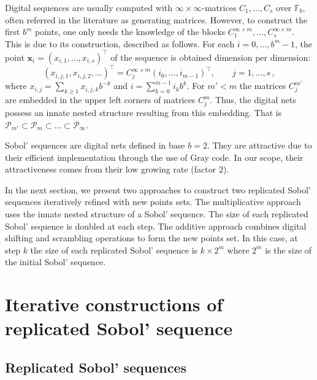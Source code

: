 \documentclass[]{elsarticle}
\theoremstyle{definition}
\newcommand{\bvec}[1]{\boldsymbol{#1}}
\newcommand{\vx}{\bvec{x}}
\begin{document}
Digital sequences are usually computed with $\infty\times\infty$-matrices $C_1,\dots,C_s$ over $\mathbb{F}_b$, often referred in the literature as generating matrices. However, to construct the first $b^m$ points, one only needs the knowledge of the blocks $C_1^{\infty\times m},\dots,C_s^{\infty\times m}$. This is due to its construction, described as follows. For each $i=0,\dots,b^m-1$, the point $\vx_i = (x_{i,1},\dots,x_{i,s})^\intercal$ of the sequence is obtained dimension per dimension:
\begin{equation}
\label{dig.net.eq.}
(x_{i,j,1},x_{i,j,2},\dots)^\intercal = C_j^{\infty\times m} (i_{0},\dots,i_{m-1})^\intercal,\qquad j= 1,\dots,s\, ,
\end{equation}
where $x_{i,j} = \sum_{k \geq 1}x_{i,j,k}b^{-k}$ and $i = \sum_{k=0}^{m-1}i_kb^{k}$. For $m' < m$ the matrices $C_j^{m'}$ are embedded in the upper left corners of matrices $C_j^{m}$. Thus, the digital nets possess an innate nested structure resulting from this embedding. That is $\mathcal{P}_{m'} \subset \mathcal{P}_m \subset \dots \subset \mathcal{P}_{\infty}$. 

Sobol' sequences are digital nets defined in base $b=2$. They are attractive due to their efficient implementation through the use of Gray code. In our scope, their attractiveness comes from their low growing rate (factor $2$). 
\bigskip

In the next section, we present two approaches to construct two replicated Sobol' sequences iteratively refined with new points sets. The multiplicative approach uses the innate nested structure of a Sobol' sequence. The size of each replicated Sobol' sequence is doubled at each step. The additive approach combines digital shifting and scrambling operations to form the new points set. In this case, at step $k$ the size of each replicated Sobol' sequence is $ k \times 2^m$ where $2^m$ is the size of the initial Sobol' sequence. 

\section{Iterative constructions of replicated Sobol' sequence}
\label{sobol.seq.cons}

\subsection{Replicated Sobol' sequences}
\end{document}
